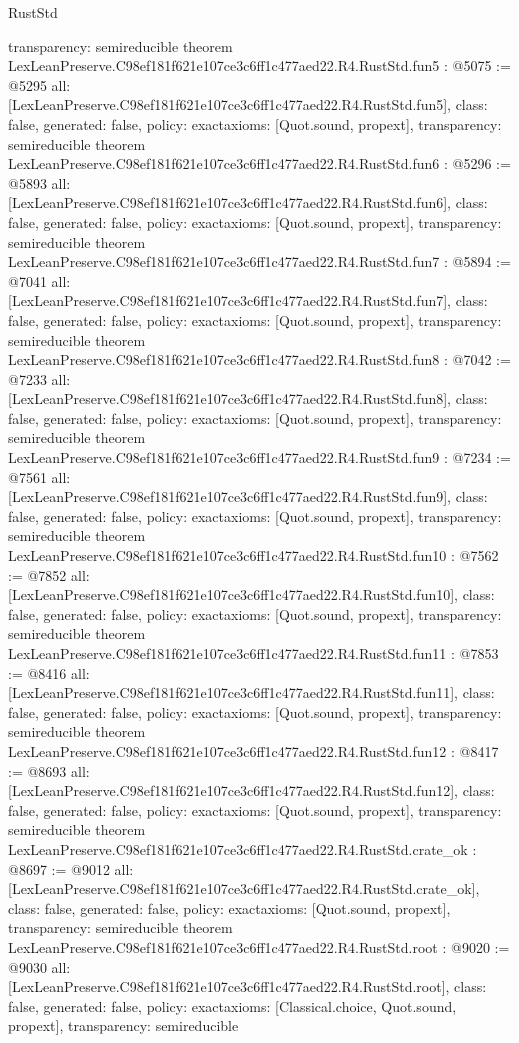 \begin{lexlean}{RustStd}
\begin{coremodule}
{  transparency: semireducible
}
theorem LexLeanPreserve.C98ef181f621e107ce3c6ff1c477aed22.R4.RustStd.fun5 : @5075 := @5295 {
  all: [LexLeanPreserve.C98ef181f621e107ce3c6ff1c477aed22.R4.RustStd.fun5],
  class: false,
  generated: false,
  policy: exact{axioms: [Quot.sound, propext]},
  transparency: semireducible
}
theorem LexLeanPreserve.C98ef181f621e107ce3c6ff1c477aed22.R4.RustStd.fun6 : @5296 := @5893 {
  all: [LexLeanPreserve.C98ef181f621e107ce3c6ff1c477aed22.R4.RustStd.fun6],
  class: false,
  generated: false,
  policy: exact{axioms: [Quot.sound, propext]},
  transparency: semireducible
}
theorem LexLeanPreserve.C98ef181f621e107ce3c6ff1c477aed22.R4.RustStd.fun7 : @5894 := @7041 {
  all: [LexLeanPreserve.C98ef181f621e107ce3c6ff1c477aed22.R4.RustStd.fun7],
  class: false,
  generated: false,
  policy: exact{axioms: [Quot.sound, propext]},
  transparency: semireducible
}
theorem LexLeanPreserve.C98ef181f621e107ce3c6ff1c477aed22.R4.RustStd.fun8 : @7042 := @7233 {
  all: [LexLeanPreserve.C98ef181f621e107ce3c6ff1c477aed22.R4.RustStd.fun8],
  class: false,
  generated: false,
  policy: exact{axioms: [Quot.sound, propext]},
  transparency: semireducible
}
theorem LexLeanPreserve.C98ef181f621e107ce3c6ff1c477aed22.R4.RustStd.fun9 : @7234 := @7561 {
  all: [LexLeanPreserve.C98ef181f621e107ce3c6ff1c477aed22.R4.RustStd.fun9],
  class: false,
  generated: false,
  policy: exact{axioms: [Quot.sound, propext]},
  transparency: semireducible
}
theorem LexLeanPreserve.C98ef181f621e107ce3c6ff1c477aed22.R4.RustStd.fun10 : @7562 := @7852 {
  all: [LexLeanPreserve.C98ef181f621e107ce3c6ff1c477aed22.R4.RustStd.fun10],
  class: false,
  generated: false,
  policy: exact{axioms: [Quot.sound, propext]},
  transparency: semireducible
}
theorem LexLeanPreserve.C98ef181f621e107ce3c6ff1c477aed22.R4.RustStd.fun11 : @7853 := @8416 {
  all: [LexLeanPreserve.C98ef181f621e107ce3c6ff1c477aed22.R4.RustStd.fun11],
  class: false,
  generated: false,
  policy: exact{axioms: [Quot.sound, propext]},
  transparency: semireducible
}
theorem LexLeanPreserve.C98ef181f621e107ce3c6ff1c477aed22.R4.RustStd.fun12 : @8417 := @8693 {
  all: [LexLeanPreserve.C98ef181f621e107ce3c6ff1c477aed22.R4.RustStd.fun12],
  class: false,
  generated: false,
  policy: exact{axioms: [Quot.sound, propext]},
  transparency: semireducible
}
theorem LexLeanPreserve.C98ef181f621e107ce3c6ff1c477aed22.R4.RustStd.crate_ok : @8697 := @9012 {
  all: [LexLeanPreserve.C98ef181f621e107ce3c6ff1c477aed22.R4.RustStd.crate_ok],
  class: false,
  generated: false,
  policy: exact{axioms: [Quot.sound, propext]},
  transparency: semireducible
}
theorem LexLeanPreserve.C98ef181f621e107ce3c6ff1c477aed22.R4.RustStd.root : @9020 := @9030 {
  all: [LexLeanPreserve.C98ef181f621e107ce3c6ff1c477aed22.R4.RustStd.root],
  class: false,
  generated: false,
  policy: exact{axioms: [Classical.choice, Quot.sound, propext]},
  transparency: semireducible
}


\end{coremodule}
\end{lexlean}
